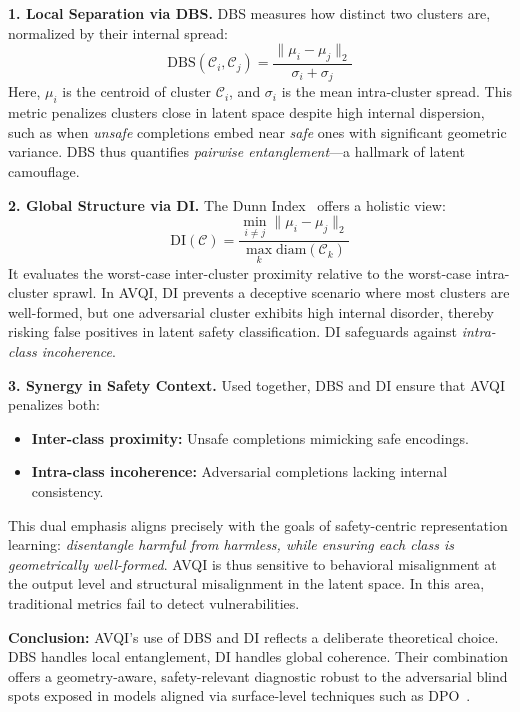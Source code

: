 \begin{itemize}[leftmargin=15pt,nolistsep]
\begin{description}
\textbf{1. Local Separation via DBS.}  
DBS measures how distinct two clusters are, normalized by their internal spread:
\[
\mathrm{DBS}(\mathcal{C}_i, \mathcal{C}_j) = \frac{\|\mu_i - \mu_j\|_2}{\sigma_i + \sigma_j}
\]
Here, $\mu_i$ is the centroid of cluster $\mathcal{C}_i$, and $\sigma_i$ is the mean intra-cluster spread. This metric penalizes clusters close in latent space despite high internal dispersion, such as when \textit{unsafe} completions embed near \textit{safe} ones with significant geometric variance. DBS thus quantifies \emph{pairwise entanglement}—a hallmark of latent camouflage.

\textbf{2. Global Structure via DI.}  
The Dunn Index~\citep{dunn1973fuzzy} offers a holistic view:
\[
\mathrm{DI}(\mathcal{C}) = \frac{\min\limits_{i \ne j} \|\mu_i - \mu_j\|_2}{\max_k \mathrm{diam}(\mathcal{C}_k)}
\]
It evaluates the worst-case inter-cluster proximity relative to the worst-case intra-cluster sprawl. In AVQI, DI prevents a deceptive scenario where most clusters are well-formed, but one adversarial cluster exhibits high internal disorder, thereby risking false positives in latent safety classification. DI safeguards against \emph{intra-class incoherence}.

\textbf{3. Synergy in Safety Context.}  
Used together, DBS and DI ensure that AVQI penalizes both:
\begin{itemize}[leftmargin=1.5em, itemsep=0pt]
\item \textbf{Inter-class proximity:} Unsafe completions mimicking safe encodings.
\item \textbf{Intra-class incoherence:} Adversarial completions lacking internal consistency.
\end{itemize}

This dual emphasis aligns precisely with the goals of safety-centric representation learning: \textit{disentangle harmful from harmless, while ensuring each class is geometrically well-formed}. AVQI is thus sensitive to behavioral misalignment at the output level and structural misalignment in the latent space. In this area, traditional metrics fail to detect vulnerabilities.

\textbf{Conclusion:} AVQI's use of DBS and DI reflects a deliberate theoretical choice. DBS handles local entanglement, DI handles global coherence. Their combination offers a geometry-aware, safety-relevant diagnostic robust to the adversarial blind spots exposed in models aligned via surface-level techniques such as DPO~\citep{rafailov2023direct}.
\end{description}



\end{itemize}
